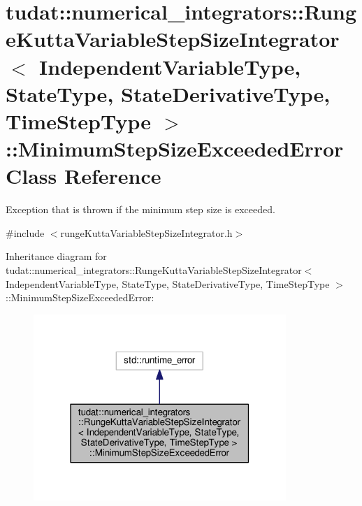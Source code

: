 \hypertarget{classtudat_1_1numerical__integrators_1_1RungeKuttaVariableStepSizeIntegrator_1_1MinimumStepSizeExceededError}{}\section{tudat\+:\+:numerical\+\_\+integrators\+:\+:Runge\+Kutta\+Variable\+Step\+Size\+Integrator$<$ Independent\+Variable\+Type, State\+Type, State\+Derivative\+Type, Time\+Step\+Type $>$\+:\+:Minimum\+Step\+Size\+Exceeded\+Error Class Reference}
\label{classtudat_1_1numerical__integrators_1_1RungeKuttaVariableStepSizeIntegrator_1_1MinimumStepSizeExceededError}


Exception that is thrown if the minimum step size is exceeded.  




{\ttfamily \#include $<$runge\+Kutta\+Variable\+Step\+Size\+Integrator.\+h$>$}



Inheritance diagram for tudat\+:\+:numerical\+\_\+integrators\+:\+:Runge\+Kutta\+Variable\+Step\+Size\+Integrator$<$ Independent\+Variable\+Type, State\+Type, State\+Derivative\+Type, Time\+Step\+Type $>$\+:\+:Minimum\+Step\+Size\+Exceeded\+Error\+:
\nopagebreak
\begin{figure}[H]
\begin{center}
\leavevmode
\includegraphics[width=271pt]{classtudat_1_1numerical__integrators_1_1RungeKuttaVariableStepSizeIntegrator_1_1MinimumStepSizeExceededError__inherit__graph}
\end{center}
\end{figure}


